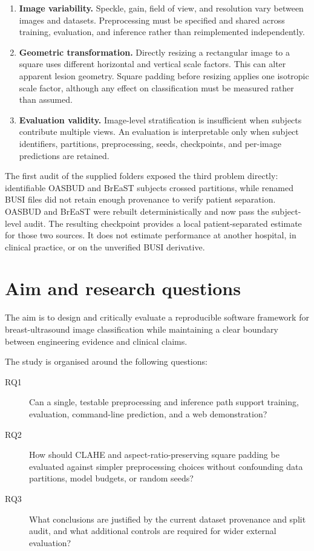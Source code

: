 \begin{enumerate}
    \item \textbf{Image variability.} Speckle, gain, field of view, and resolution vary between images and datasets. Preprocessing must be specified and shared across training, evaluation, and inference rather than reimplemented independently.
    \item \textbf{Geometric transformation.} Directly resizing a rectangular image to a square uses different horizontal and vertical scale factors. This can alter apparent lesion geometry. Square padding before resizing applies one isotropic scale factor, although any effect on classification must be measured rather than assumed.
    \item \textbf{Evaluation validity.} Image-level stratification is insufficient when subjects contribute multiple views. An evaluation is interpretable only when subject identifiers, partitions, preprocessing, seeds, checkpoints, and per-image predictions are retained.
\end{enumerate}

The first audit of the supplied folders exposed the third problem directly: identifiable OASBUD and BrEaST subjects crossed partitions, while renamed BUSI files did not retain enough provenance to verify patient separation. OASBUD and BrEaST were rebuilt deterministically and now pass the subject-level audit. The resulting checkpoint provides a local patient-separated estimate for those two sources. It does not estimate performance at another hospital, in clinical practice, or on the unverified BUSI derivative.

\section{Aim and research questions}
The aim is to design and critically evaluate a reproducible software framework for breast-ultrasound image classification while maintaining a clear boundary between engineering evidence and clinical claims.

The study is organised around the following questions:

\begin{description}
    \item[RQ1] Can a single, testable preprocessing and inference path support training, evaluation, command-line prediction, and a web demonstration?
    \item[RQ2] How should CLAHE and aspect-ratio-preserving square padding be evaluated against simpler preprocessing choices without confounding data partitions, model budgets, or random seeds?
    \item[RQ3] What conclusions are justified by the current dataset provenance and split audit, and what additional controls are required for wider external evaluation?
\end{description}

